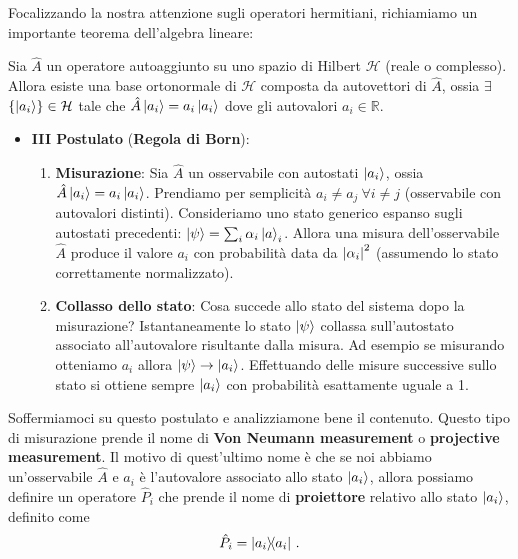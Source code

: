 \noindent Focalizzando la nostra attenzione sugli operatori hermitiani, richiamiamo un importante teorema dell'algebra lineare:
\begin{teorema}
    Sia $\hat{A}$ un operatore autoaggiunto su uno spazio di Hilbert $\mathcal{H}$ (reale o complesso). Allora esiste una base ortonormale di $\mathcal{H}$ composta da autovettori di $\hat{A}$, ossia $\exists$ $\lbrace \ket{a_i} \rbrace \in \mathcal{H}$ tale che $\hat{A} \ket{a_i} = a_i \ket{a_i}$ dove gli autovalori $a_i \in \mathbb{R}$.
\end{teorema}

\begin{itemize}
    \item \textbf{III Postulato} (\textbf{Regola di Born}):
    \begin{enumerate}
        \item \textbf{Misurazione}: Sia $\hat{A}$ un osservabile con autostati $\ket{a_i}$, ossia $\hat{A} \ket{a_i} = a_i \ket{a_i}$. Prendiamo per semplicità $a_i \neq a_j \ \forall i \neq j$ (osservabile con autovalori distinti). Consideriamo uno stato generico espanso sugli autostati precedenti: $\ket \psi = \sum_i \alpha_i \ket a_i$. Allora una misura dell'osservabile $\hat{A}$ produce il valore $a_i$ con probabilità data da $\abs{\alpha_i}^2$ (assumendo lo stato correttamente normalizzato).
        
        \item \textbf{Collasso dello stato}: Cosa succede allo stato del sistema dopo la misurazione? Istantaneamente lo stato $\ket \psi$ collassa sull'autostato associato all'autovalore risultante dalla misura. Ad esempio se misurando otteniamo $a_i$ allora $\ket{\psi} \rightarrow \ket{a_i}$. Effettuando delle misure successive sullo stato si ottiene sempre $\ket{a_i}$ con probabilità esattamente uguale a 1.  
    \end{enumerate}
\end{itemize}
Soffermiamoci su questo postulato e analizziamone bene il contenuto. Questo tipo di misurazione prende il nome di \textbf{Von Neumann measurement} o \textbf{projective measurement}. Il motivo di quest'ultimo nome è che se noi abbiamo un'osservabile $\hat A$ e $a_i$ è l'autovalore associato allo stato $\ket{a_i}$, allora possiamo definire un operatore $\hat P_i$ che prende il nome di \textbf{proiettore} relativo allo stato $\ket{a_i}$, definito come
\begin{equation*}
    \hat P_i=\op{a_i}{a_i} \, .
\end{equation*}
